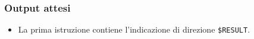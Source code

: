 \documentclass[../SperimentazioniPratiche.tex]{subfiles}
\begin{document}
	\subsubsection{Output attesi}
		\begin{itemize}
			\item La prima istruzione contiene l'indicazione di direzione  \verb|$RESULT|.
		\end{itemize}

	
	
		
	
\end{document}
